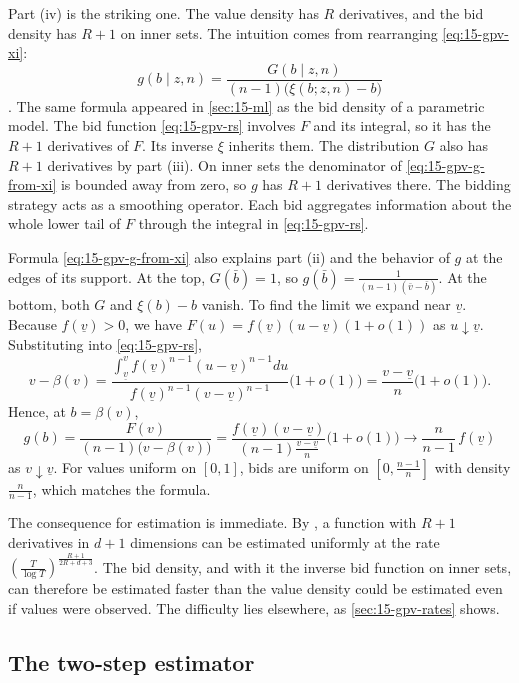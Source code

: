 Part (iv) is the striking one. The value density has $R$ derivatives, and the bid density has $R+1$ on inner sets. The intuition comes from rearranging \eqref{eq:15-gpv-xi}:
\begin{equation}\label{eq:15-gpv-g-from-xi}
g(b\mid z,n)=\frac{G(b\mid z,n)}{(n-1)\big(\xi(b;z,n)-b\big)}
\end{equation}
\citep[p.~536]{GuerrePerrigneVuong2000}. The same formula appeared in \cref{sec:15-ml} as the bid density of a parametric model. The bid function \eqref{eq:15-gpv-rs} involves $F$ and its integral, so it has the $R+1$ derivatives of $F$. Its inverse $\xi$ inherits them. The distribution $G$ also has $R+1$ derivatives by part (iii). On inner sets the denominator of \eqref{eq:15-gpv-g-from-xi} is bounded away from zero, so $g$ has $R+1$ derivatives there. The bidding strategy acts as a smoothing operator. Each bid aggregates information about the whole lower tail of $F$ through the integral in \eqref{eq:15-gpv-rs}.

Formula \eqref{eq:15-gpv-g-from-xi} also explains part (ii) and the behavior of $g$ at the edges of its support. At the top, $G(\bar b)=1$, so $g(\bar b)=\frac{1}{(n-1)(\bar v-\bar b)}$. At the bottom, both $G$ and $\xi(b)-b$ vanish. To find the limit we expand near $\underline v$. Because $f(\underline v)>0$, we have $F(u)=f(\underline v)(u-\underline v)(1+o(1))$ as $u\downarrow\underline v$. Substituting into \eqref{eq:15-gpv-rs},
\[
v-\beta(v)=\frac{\int_{\underline v}^vf(\underline v)^{n-1}(u-\underline v)^{n-1}du}{f(\underline v)^{n-1}(v-\underline v)^{n-1}}\big(1+o(1)\big)=\frac{v-\underline v}{n}\big(1+o(1)\big).
\]
Hence, at $b=\beta(v)$,
\[
g(b)=\frac{F(v)}{(n-1)\big(v-\beta(v)\big)}=\frac{f(\underline v)(v-\underline v)}{(n-1)\frac{v-\underline v}{n}}\big(1+o(1)\big)\longrightarrow\frac{n}{n-1}\,f(\underline v)
\]
as $v\downarrow\underline v$. For values uniform on $[0,1]$, bids are uniform on $[0,\frac{n-1}{n}]$ with density $\frac{n}{n-1}$, which matches the formula.

The consequence for estimation is immediate. By \citet{Stone1982}, a function with $R+1$ derivatives in $d+1$ dimensions can be estimated uniformly at the rate $(\frac{T}{\log T})^{\frac{R+1}{2R+d+3}}$. The bid density, and with it the inverse bid function on inner sets, can therefore be estimated faster than the value density could be estimated even if values were observed. The difficulty lies elsewhere, as \cref{sec:15-gpv-rates} shows.

\subsection{The two-step estimator}\label{sec:15-gpv-estimator}

